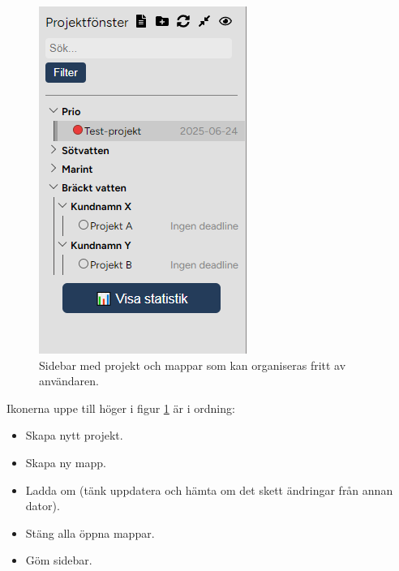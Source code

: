 \begin{figure}[H]
    \centering
    \includegraphics[width=0.5\linewidth]{images/sidebar2.png}
    \caption{Sidebar med projekt och mappar som kan organiseras fritt av användaren.}
    \label{fig:sidebar}
\end{figure}

\noindent Ikonerna uppe till höger i figur \ref{fig:sidebar} är i ordning:
\begin{itemize}
    \item Skapa nytt projekt.
    \item Skapa ny mapp.
    \item Ladda om (tänk uppdatera och hämta om det skett ändringar från annan dator).
    \item Stäng alla öppna mappar.
    \item Göm sidebar.
\end{itemize}

